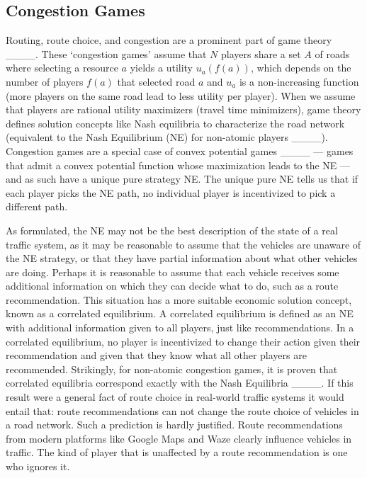 \subsection{Congestion Games}

Routing, route choice, and congestion are a prominent part of game theory ____. These `congestion games' assume that $N$ players share a set $A$ of roads where selecting a resource $a$ yields a utility $u_a(f(a))$, which depends on the number of players $f(a)$ that selected road $a$ and $u_a$ is a non-increasing function (more players on the same road lead to less utility per player). When we assume that players are rational utility maximizers (travel time minimizers), game theory defines solution concepts like Nash equilibria to characterize the road network (equivalent to the Nash Equilibrium (NE) for non-atomic players ____). Congestion games are a special case of convex potential games ____ --- games that admit a convex potential function whose maximization leads to the NE --- and as such have a unique pure strategy NE. The unique pure NE tells us that if each player picks the NE path, no individual player is incentivized to pick a different path. 

As formulated, the NE may not be the best description of the state of a real traffic system, as it may be reasonable to assume that the vehicles are unaware of the NE strategy, or that they have partial information about what other vehicles are doing. Perhaps it is reasonable to assume that each vehicle receives some additional information on which they can decide what to do, such as a route recommendation. This situation has a more suitable economic solution concept, known as a correlated equilibrium. A correlated equilibrium is defined as an NE with additional information given to all players, just like recommendations. In a correlated equilibrium, no player is incentivized to change their action given their recommendation and given that they know what all other players are recommended. Strikingly, for non-atomic congestion games, it is proven that correlated equilibria correspond exactly with the Nash Equilibria ____. If this result were a general fact of route choice in real-world traffic systems it would entail that: route recommendations can not change the route choice of vehicles in a road network. Such a prediction is hardly justified. Route recommendations from modern platforms like Google Maps and Waze clearly influence vehicles in traffic. The kind of player that is unaffected by a route recommendation is one who ignores it. 

